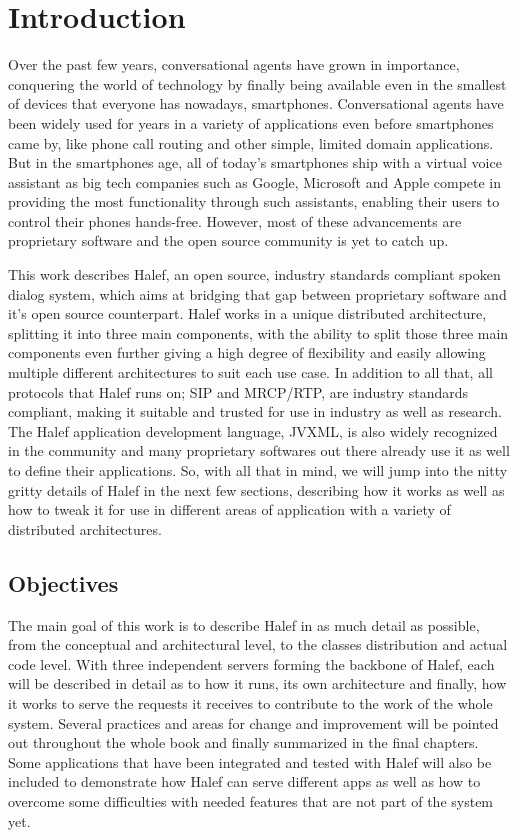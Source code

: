 \chapter{Introduction}
\label{chap:intro}

Over the past few years, conversational agents have grown in importance, conquering the world of technology by finally being available even in the smallest of devices that everyone has nowadays, smartphones.
Conversational agents have been widely used for years in a variety of applications even before smartphones came by, like phone call routing and other simple, limited domain applications.
But in the smartphones age, all of today's smartphones ship with a virtual voice assistant as big tech companies such as Google, Microsoft and Apple compete in providing the most functionality through such assistants, enabling their users to control their phones hands-free.
However, most of these advancements are proprietary software and the open source community is yet to catch up.

This work describes Halef, an open source, industry standards compliant spoken dialog system, which aims at bridging that gap between proprietary software and it's open source counterpart.
Halef works in a unique distributed architecture, splitting it into three main components, with the ability to split those three main components even further giving a high degree of flexibility and easily allowing multiple different architectures to suit each use case.
In addition to all that, all protocols that Halef runs on; SIP and MRCP/RTP, are industry standards compliant, making it suitable and trusted for use in industry as well as research.
The Halef application development language, JVXML, is also widely recognized in the community and many proprietary softwares out there already use it as well to define their applications.
So, with all that in mind, we will jump into the nitty gritty details of Halef in the next few sections, describing how it works as well as how to tweak it for use in different areas of application with a variety of distributed architectures.

\section{Objectives} \label{sec:s1}
The main goal of this work is to describe Halef in as much detail as possible, from the conceptual and architectural level, to the classes distribution and actual code level.
With three independent servers forming the backbone of Halef, each will be described in detail as to how it runs, its own architecture and finally, how it works to serve the requests it receives to contribute to the work of the whole system.
Several practices and areas for change and improvement will be pointed out throughout the whole book and finally summarized in the final chapters.
Some applications that have been integrated and tested with Halef will also be included to demonstrate how Halef can serve different apps as well as how to overcome some difficulties with needed features that are not part of the system yet.

